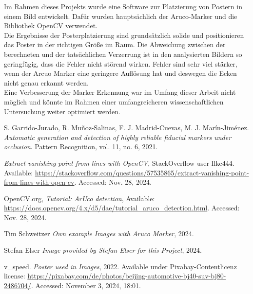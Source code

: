 \documentclass[a4paper,twocolumn]{article}
\begin{document}
Im Rahmen dieses Projekts wurde eine Software zur Platzierung von Postern in einem Bild entwickelt. Dafür wurden hauptsächlich der Aruco-Marker und die Bibliothek OpenCV verwendet.
\\
Die Ergebnisse der Posterplatzierung sind grundsätzlich solide und positionieren das Poster in der richtigen Größe im Raum. Die Abweichung zwischen der berechneten und der tatsächlichen Verzerrung ist in den analysierten Bildern so geringfügig, dass die Fehler nicht störend wirken. Fehler sind sehr viel stärker, wenn der Arcuo Marker eine geringere Auflösung hat und deswegen die Ecken nicht genau erkannt werden.
\\
Eine Verbesserung der Marker Erkennung war im Umfang dieser Arbeit nicht möglich und könnte im Rahmen einer umfangreicheren wissenschaftlichen Untersuchung weiter optimiert werden.


\begin{thebibliography}{9}

    S. Garrido-Jurado, R. Muñoz-Salinas, F. J. Madrid-Cuevas, M. J. Marín-Jiménez. 
    \textit{Automatic generation and detection of highly reliable fiducial markers under occlusion}. 
    Pattern Recognition, vol. 11, no. 6, 2021.
    
    \textit{Extract vanishing point from lines with OpenCV}, 
    StackOverflow user Ilke444. Available: \url{https://stackoverflow.com/questions/57535865/extract-vanishing-point-from-lines-with-open-cv}. 
    Accessed: Nov. 28, 2024.

    OpenCV.org, 
    \textit{Tutorial: ArUco detection}, 
    Available: \url{https://docs.opencv.org/4.x/d5/dae/tutorial_aruco_detection.html}. 
    Accessed: Nov. 28, 2024.

    Tim Schweitzer \textit{Own example Images with Aruco Marker}, 2024.

    Stefan Elser \textit{Image provided by Stefan Elser for this Project}, 2024.

    v\_speed. \textit{Poster used in Images}, 2022. Available under Pixabay-Contentlicenz license: \url{https://pixabay.com/de/photos/beijing-automotive-bj40-suv-bj80-2486704/}. Accessed: November 3, 2024, 18:01.

\end{thebibliography}
\end{document}
